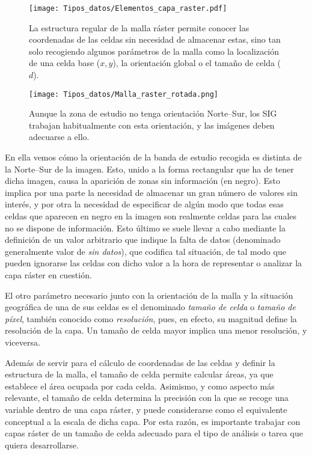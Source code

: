 \begin{multicols}{2}
\begin{figure*}[ht]
\begin{minipage}{0.49\linewidth}
\texttt{[image: Tipos\_datos/Elementos\_capa\_raster.pdf]}
\caption{\small La estructura regular de la malla ráster permite conocer las coordenadas de las celdas sin necesidad de almacenar estas, sino tan solo recogiendo algunos parámetros de la malla como la localización de una celda base ($x,y$), la orientación global o el tamaño de celda ($d$).}
\label{Fig:Elementos_capa_raster} 
\end{minipage}
\hfill
\begin{minipage}{0.49\linewidth}
\centering
\texttt{[image: Tipos\_datos/Malla\_raster\_rotada.png]}
\caption{\small Aunque la zona de estudio no tenga orientación Norte--Sur, los SIG trabajan habitualmente con esta orientación, y las imágenes deben adecuarse a ello.}
\label{Fig:Malla_raster_rotada}
\end{minipage}
\end{figure*}

En ella vemos cómo la orientación de la banda de estudio recogida es distinta de la Norte--Sur de la imagen. Esto, unido a la forma rectangular que ha de tener dicha imagen, causa la aparición de zonas sin información (en negro). Esto implica por una parte la necesidad de almacenar un gran número de valores sin interés, y por otra la necesidad de especificar de algún modo que todas esas celdas que aparecen en negro en la imagen son realmente celdas para las cuales no se dispone de información. Esto último se suele llevar a cabo mediante la definición de un valor arbitrario que indique la falta de datos (denominado generalmente valor de \emph{sin datos}), que codifica tal situación, de tal modo que pueden ignorarse las celdas con dicho valor a la hora de representar o analizar la capa ráster en cuestión. 

El otro parámetro necesario junto con la orientación de la malla y la situación geográfica de una de sus celdas es el denominado \emph{tamaño de celda} o \emph{tamaño de píxel}, también conocido como \emph{resolución}, pues, en efecto, su magnitud define la resolución de la capa. Un tamaño de celda mayor implica una menor resolución, y viceversa.

Además de servir para el cálculo de coordenadas de las celdas y definir la estructura de la malla, el tamaño de celda permite calcular áreas, ya que establece el área ocupada por cada celda. Asimismo, y como aspecto más relevante, el tamaño de celda determina la precisión con la que se recoge una variable dentro de una capa ráster, y puede considerarse como el equivalente conceptual a la escala de dicha capa. Por esta razón, es importante trabajar con capas ráster de un tamaño de celda adecuado para el tipo de análisis o tarea que quiera desarrollarse.


\end{multicols}
